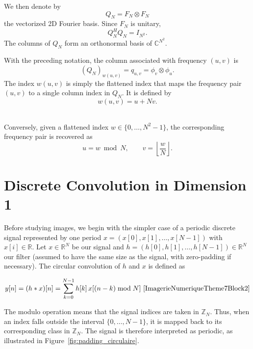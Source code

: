 We then denote by
\begin{equation}
    Q_N = F_N \otimes F_N
    \label{eq:def_base_fourier_2d_vectorisee}
\end{equation}
the vectorized 2D Fourier basis. Since $F_N$ is unitary,
\[
    Q_N^H Q_N = I_{N^2}.
\]
The columns of $Q_N$ form an orthonormal basis of $\mathbb{C}^{N^2}$.

With the preceding notation, the column associated with frequency $(u,v)$ is
\[
    (Q_N)_{w(u,v)}
    =
    q_{u,v}
    =
    \phi_v\otimes\phi_u.
\]
The index $w(u,v)$ is simply the flattened index that maps the frequency pair
$(u,v)$ to a single column index in $Q_N$. It is defined by
\begin{equation}
    w(u,v)=u+Nv.
    \label{eq:indice_frequence_aplati}
\end{equation}\

Conversely, given a flattened index $w\in\{0,\dots,N^2-1\}$, the corresponding frequency
pair is recovered as
\[
    u = w \bmod N,
    \qquad
    v = \left\lfloor \frac{w}{N} \right\rfloor.
\]

\section{Discrete Convolution in Dimension 1}

Before studying images, we begin with the simpler case of a periodic discrete signal represented
by one period $x = (x[0], x[1], \ldots, x[N-1])$ with $x[i] \in \mathbb{R}$.
Let $x \in \mathbb{R}^N$ be our signal and $h = (h[0], h[1], \ldots, h[N-1]) \in \mathbb{R}^N$ our filter (assumed
to have the same size as the signal, with zero-padding if necessary).
The circular convolution of $h$ and $x$ is defined as

\[
y[n] = (h * x)[n] = \sum_{k=0}^{N-1} h[k]\,x[(n-k) \bmod N] \text{~\cite{ImagerieNumeriqueTheme7Block2}}
\]

The modulo operation means that the signal indices are taken in
\(\mathbb{Z}_N\). 
Thus, when an index falls outside the interval \(\{0,\ldots,N-1\}\),
it is mapped back to its corresponding class in \(\mathbb{Z}_N\).
The signal is therefore interpreted as periodic, as illustrated in
Figure~\ref{fig:padding_circulaire}.

